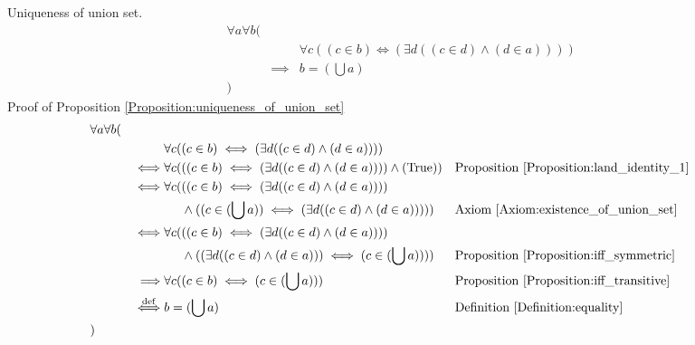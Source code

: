 \begin{prop}
\label{Proposition:uniqueness_of_union_set}
Uniqueness of union set.
\begin{align*}
& \forall a \forall b ( \\
& & & \forall c ((c \in b) \iff (\exists d ((c \in d) \land (d \in a)))) \\
& & \implies & b = (\bigcup a) \\
& )
\end{align*}
Proof of Proposition \ref{Proposition:uniqueness_of_union_set}
\begin{align*}
& \forall a \forall b ( \\
& & & \forall c ((c \in b) \iff (\exists d ((c \in d) \land (d \in a)))) \\
& & \iff & \forall c (((c \in b) \iff (\exists d ((c \in d) \land (d \in a)))) \land (\text{True}))
& & \text{Proposition \ref{Proposition:land_identity_1}} \\
& & \iff & \forall c (((c \in b) \iff (\exists d ((c \in d) \land (d \in a)))) \\
& & & \phantom{\forall c (} \land ((c \in (\bigcup a)) \iff (\exists d ((c \in d) \land (d \in a)))))
& & \text{Axiom \ref{Axiom:existence_of_union_set}} \\
& & \iff & \forall c (((c \in b) \iff (\exists d ((c \in d) \land (d \in a)))) \\
& & & \phantom{\forall c (} \land ((\exists d ((c \in d) \land (d \in a))) \iff (c \in (\bigcup a))))
& & \text{Proposition \ref{Proposition:iff_symmetric}} \\
& & \implies & \forall c ((c \in b) \iff (c \in (\bigcup a)))
& & \text{Proposition \ref{Proposition:iff_transitive}} \\
& & \overset{\operatorname{def}}{\iff} & b = (\bigcup a)
& & \text{Definition \ref{Definition:equality}} \\
& )
\end{align*}
\end{prop}

